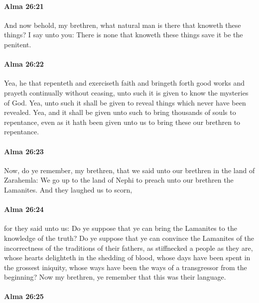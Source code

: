 		\paragraph{Alma 26:21} %
			\label{ALMA-26-21}

			And now behold, my brethren,
			what natural man is there that knoweth these things?
			I say unto you:
			There is none that knoweth these things save it be the penitent.

		\paragraph{Alma 26:22} %
			\label{ALMA-26-22}

			Yea, he that repenteth and exerciseth faith
			and bringeth forth good works and prayeth continually without ceasing,
			unto such it is given to know the mysteries of God.
			Yea, unto such it shall be given to reveal things which never have been revealed.
			Yea, and it shall be given unto such to bring thousands of souls to repentance,
			even as it hath been given unto us to bring these our brethren to repentance.

		\paragraph{Alma 26:23} %
			\label{ALMA-26-23}

			Now, do ye remember, my brethren,
			that we said unto our brethren in the land of Zarahemla:
			We go up to the land of Nephi to preach unto our brethren the Lamanites.
			And they laughed us to scorn,

		\paragraph{Alma 26:24} %
			\label{ALMA-26-24}

			for they said unto us:
			Do ye suppose that ye can bring the Lamanites to the knowledge of the truth?
			Do ye suppose that ye can convince the Lamanites
			of the incorrectness of the traditions of their fathers,
			as stiffnecked a people as they are,
			whose hearts delighteth in the shedding of blood,
			whose days have been spent in the grossest iniquity,
			whose ways have been the ways of a transgressor from the beginning?
			Now my brethren, ye remember that this was their language.

		\paragraph{Alma 26:25} %
			\label{ALMA-26-25}

